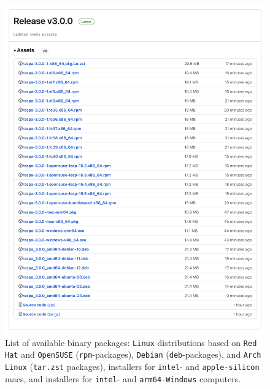 \begin{figure}[p]
 \centering
  \includegraphics[width=0.95\linewidth]{introduction/raspa3_releases.png}
  \caption{List of available binary packages: \texttt{Linux} distributions based on \texttt{Red Hat} and 
  \texttt{OpenSUSE} (\texttt{rpm}-packages), \texttt{Debian} (\texttt{deb}-packages), and \texttt{Arch} \texttt{Linux} 
  (\texttt{tar.zst} packages), installers for \texttt{intel}- and \texttt{apple-silicon} macs,
  and installers for \texttt{intel}- and \texttt{arm64-Windows} computers.}
  \label{fig: binary_packages}
\end{figure}
